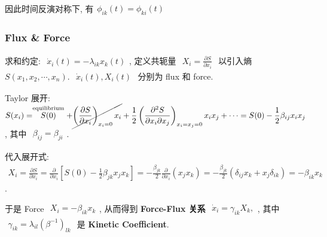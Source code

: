 \documentclass[../../main.tex]{subfiles}
\begin{document}
因此时间反演对称下, 有$\begin{aligned}
    \boxed{\phi_{ik}(t) = \phi_{ki}(t)}
\end{aligned}$

\subsubsection{Flux \& Force}

求和约定: $\begin{aligned}
    \dot{x}_{i}(t) = -\lambda_{ik}x_{k}(t)
\end{aligned}$, 定义共轭量 $\begin{aligned}
    X_{i} = \frac{\partial S}{\partial x_{i}}
\end{aligned}$ 以引入熵 $S(x_{1},x_{2},\cdots,x_{n})$. $\begin{aligned}
    \dot{x}_{i}(t), X_{i}(t)
\end{aligned}$ 分别为 flux 和 force.

Taylor 展开: $\begin{aligned}
    S(x_{i}) = \stackrel{\text{equilibrium}}{S(0)} + \cancel{\left(\frac{\partial S}{\partial x_{i}}\right)_{x_{i}=0}x_{i}} + \frac{1}{2}\left(\frac{\partial^{2}S}{\partial x_{i}\partial x_{j}}\right)_{x_{i}=x_{j} = 0}x_{i}x_{j} + \cdots = S(0) - \frac{1}{2}\beta_{ij}x_{i}x_{j}
\end{aligned}$, 其中 $\begin{aligned}
    \beta_{ij} = \beta_{ji}
\end{aligned}$. 

代入展开式: $\begin{aligned}
    X_{i} = \frac{\partial S}{\partial x_{i}} = \frac{\partial}{\partial x_{i}}\left[
        S(0) - \frac{1}{2}\beta_{jk}x_{j}x_{k}
    \right] = -\frac{\beta_{jk}}{2}\frac{\partial}{\partial x_{i}}(x_{j}x_{k}) = -\frac{\beta_{jk}}{2}(\delta_{ij}x_{k} + x_{j}\delta_{ik}) = -\beta_{ik}x_{k}
\end{aligned}$. 

于是 Force $\begin{aligned}
    X_{i} = -\beta_{ik}x_{k}
\end{aligned}$, 从而得到 \textbf{Force-Flux 关系} $\begin{aligned}
    \boxed{\dot{x}_{i} = \gamma_{ik}X_{k}},
\end{aligned}$, 其中 $\begin{aligned}
    \gamma_{ik} = \lambda_{il}(\beta^{-1})_{lk}
\end{aligned}$ 是 \textbf{Kinetic Coefficient}. 
\end{document}
